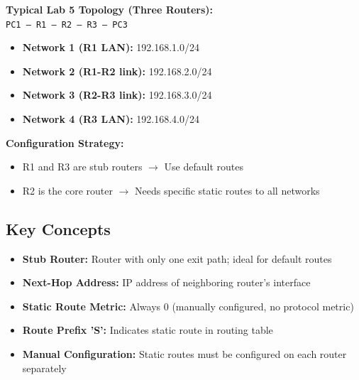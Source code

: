 \documentclass[12pt,a4paper]{article}
\begin{document}
\begin{center}
\begin{tcolorbox}[colback=light,colframe=primary,width=0.9\textwidth]
\textbf{Typical Lab 5 Topology (Three Routers):}\\[0.2cm]
\texttt{PC1 --- R1 --- R2 --- R3 --- PC3}\\[0.3cm]
\begin{itemize}[noitemsep]
    \item \textbf{Network 1 (R1 LAN):} 192.168.1.0/24
    \item \textbf{Network 2 (R1-R2 link):} 192.168.2.0/24
    \item \textbf{Network 3 (R2-R3 link):} 192.168.3.0/24
    \item \textbf{Network 4 (R3 LAN):} 192.168.4.0/24
\end{itemize}

\vspace{0.2cm}
\textbf{Configuration Strategy:}
\begin{itemize}[noitemsep]
    \item R1 and R3 are stub routers $\rightarrow$ Use default routes
    \item R2 is the core router $\rightarrow$ Needs specific static routes to all networks
\end{itemize}
\end{tcolorbox}
\end{center}

\subsection{Key Concepts}

\begin{itemize}
    \item \textbf{Stub Router:} Router with only one exit path; ideal for default routes
    \item \textbf{Next-Hop Address:} IP address of neighboring router's interface
    \item \textbf{Static Route Metric:} Always 0 (manually configured, no protocol metric)
    \item \textbf{Route Prefix 'S':} Indicates static route in routing table
    \item \textbf{Manual Configuration:} Static routes must be configured on each router separately
\end{itemize}
\end{document}
